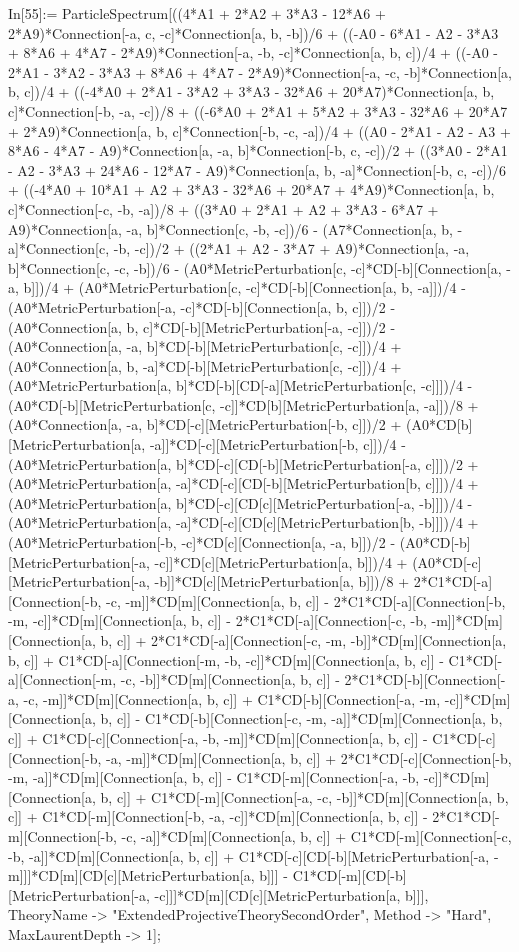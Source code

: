 In[55]:= ParticleSpectrum[((4*A1 + 2*A2 + 3*A3 - 12*A6 + 2*A9)*Connection[-a, c, -c]*Connection[a, b, -b])/6 + ((-A0 - 6*A1 - A2 - 3*A3 + 8*A6 + 4*A7 - 2*A9)*Connection[-a, -b, -c]*Connection[a, b, c])/4 + ((-A0 - 2*A1 - 3*A2 - 3*A3 + 8*A6 + 4*A7 - 2*A9)*Connection[-a, -c, -b]*Connection[a, b, c])/4 + ((-4*A0 + 2*A1 - 3*A2 + 3*A3 - 32*A6 + 20*A7)*Connection[a, b, c]*Connection[-b, -a, -c])/8 + ((-6*A0 + 2*A1 + 5*A2 + 3*A3 - 32*A6 + 20*A7 + 2*A9)*Connection[a, b, c]*Connection[-b, -c, -a])/4 + ((A0 - 2*A1 - A2 - A3 + 8*A6 - 4*A7 - A9)*Connection[a, -a, b]*Connection[-b, c, -c])/2 + ((3*A0 - 2*A1 - A2 - 3*A3 + 24*A6 - 12*A7 - A9)*Connection[a, b, -a]*Connection[-b, c, -c])/6 + ((-4*A0 + 10*A1 + A2 + 3*A3 - 32*A6 + 20*A7 + 4*A9)*Connection[a, b, c]*Connection[-c, -b, -a])/8 + ((3*A0 + 2*A1 + A2 + 3*A3 - 6*A7 + A9)*Connection[a, -a, b]*Connection[c, -b, -c])/6 - (A7*Connection[a, b, -a]*Connection[c, -b, -c])/2 + ((2*A1 + A2 - 3*A7 + A9)*Connection[a, -a, b]*Connection[c, -c, -b])/6 - (A0*MetricPerturbation[c, -c]*CD[-b][Connection[a, -a, b]])/4 + (A0*MetricPerturbation[c, -c]*CD[-b][Connection[a, b, -a]])/4 - (A0*MetricPerturbation[-a, -c]*CD[-b][Connection[a, b, c]])/2 - (A0*Connection[a, b, c]*CD[-b][MetricPerturbation[-a, -c]])/2 - (A0*Connection[a, -a, b]*CD[-b][MetricPerturbation[c, -c]])/4 + (A0*Connection[a, b, -a]*CD[-b][MetricPerturbation[c, -c]])/4 + (A0*MetricPerturbation[a, b]*CD[-b][CD[-a][MetricPerturbation[c, -c]]])/4 - (A0*CD[-b][MetricPerturbation[c, -c]]*CD[b][MetricPerturbation[a, -a]])/8 + (A0*Connection[a, -a, b]*CD[-c][MetricPerturbation[-b, c]])/2 + (A0*CD[b][MetricPerturbation[a, -a]]*CD[-c][MetricPerturbation[-b, c]])/4 - (A0*MetricPerturbation[a, b]*CD[-c][CD[-b][MetricPerturbation[-a, c]]])/2 + (A0*MetricPerturbation[a, -a]*CD[-c][CD[-b][MetricPerturbation[b, c]]])/4 + (A0*MetricPerturbation[a, b]*CD[-c][CD[c][MetricPerturbation[-a, -b]]])/4 - (A0*MetricPerturbation[a, -a]*CD[-c][CD[c][MetricPerturbation[b, -b]]])/4 + (A0*MetricPerturbation[-b, -c]*CD[c][Connection[a, -a, b]])/2 - (A0*CD[-b][MetricPerturbation[-a, -c]]*CD[c][MetricPerturbation[a, b]])/4 + (A0*CD[-c][MetricPerturbation[-a, -b]]*CD[c][MetricPerturbation[a, b]])/8 + 2*C1*CD[-a][Connection[-b, -c, -m]]*CD[m][Connection[a, b, c]] - 2*C1*CD[-a][Connection[-b, -m, -c]]*CD[m][Connection[a, b, c]] - 2*C1*CD[-a][Connection[-c, -b, -m]]*CD[m][Connection[a, b, c]] + 2*C1*CD[-a][Connection[-c, -m, -b]]*CD[m][Connection[a, b, c]] + C1*CD[-a][Connection[-m, -b, -c]]*CD[m][Connection[a, b, c]] - C1*CD[-a][Connection[-m, -c, -b]]*CD[m][Connection[a, b, c]] - 2*C1*CD[-b][Connection[-a, -c, -m]]*CD[m][Connection[a, b, c]] + C1*CD[-b][Connection[-a, -m, -c]]*CD[m][Connection[a, b, c]] - C1*CD[-b][Connection[-c, -m, -a]]*CD[m][Connection[a, b, c]] + C1*CD[-c][Connection[-a, -b, -m]]*CD[m][Connection[a, b, c]] - C1*CD[-c][Connection[-b, -a, -m]]*CD[m][Connection[a, b, c]] + 2*C1*CD[-c][Connection[-b, -m, -a]]*CD[m][Connection[a, b, c]] - C1*CD[-m][Connection[-a, -b, -c]]*CD[m][Connection[a, b, c]] + C1*CD[-m][Connection[-a, -c, -b]]*CD[m][Connection[a, b, c]] + C1*CD[-m][Connection[-b, -a, -c]]*CD[m][Connection[a, b, c]] - 2*C1*CD[-m][Connection[-b, -c, -a]]*CD[m][Connection[a, b, c]] + C1*CD[-m][Connection[-c, -b, -a]]*CD[m][Connection[a, b, c]] + C1*CD[-c][CD[-b][MetricPerturbation[-a, -m]]]*CD[m][CD[c][MetricPerturbation[a, b]]] - C1*CD[-m][CD[-b][MetricPerturbation[-a, -c]]]*CD[m][CD[c][MetricPerturbation[a, b]]], TheoryName -> "ExtendedProjectiveTheorySecondOrder", Method -> "Hard", MaxLaurentDepth -> 1]; 